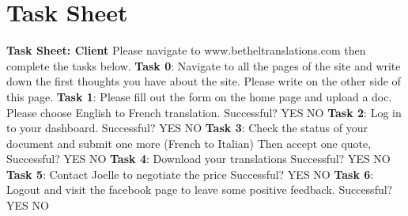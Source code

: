 \documentclass{l3proj}
\begin{document}
\section{Task Sheet}
\label{sect:task-sh}
\textbf{Task Sheet: Client}\newline 
Please navigate to www.betheltranslations.com then complete the tasks below. \newline \newline
\textbf{Task 0}: Navigate to all the pages of the site and write down the first thoughts you have about the site. Please write on the other side of this page. \newline \newline
\textbf{Task 1}: Please fill out the form on the home page and upload a doc. Please choose English to French translation. \newline \newline
Successful?    YES      NO \newline \newline
\textbf{Task 2}: Log in to your dashboard.  \newline \newline
Successful?    YES      NO \newline \newline
\textbf{Task 3}: Check the status of your document and submit one more (French to Italian) Then accept one quote, \newline \newline
Successful?    YES      NO \newline \newline
\textbf{Task 4}: Download your translations \newline \newline
Successful?    YES      NO \newline \newline
\textbf{Task 5}: Contact Joelle to negotiate the price \newline \newline
Successful?    YES      NO \newline \newline
\textbf{Task 6}: Logout and visit the facebook page to leave some positive feedback. \newline \newline
Successful?    YES      NO \newline \newline
 
 
    
\end{document}

